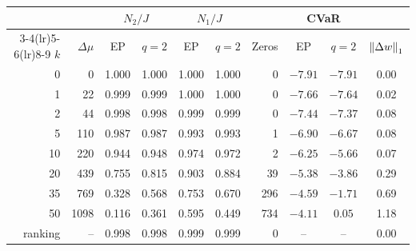 \begin{tabular}{rrccccrccc}
\toprule
 & & \multicolumn{2}{c}{$N_2/J$} & \multicolumn{2}{c}{$N_1/J$} & & \multicolumn{2}{c}{CVaR} & \\
\cmidrule(lr){3-4}\cmidrule(lr){5-6}\cmidrule(lr){8-9}
$k$ & $\Delta\mu$ & EP & $q=2$ & EP & $q=2$ & Zeros & EP & $q=2$ & $\left\lVert \Delta w \right\rVert_1$ \\
\midrule
0 & 0 & 1.000 & 1.000 & 1.000 & 1.000 & 0 & $-7.91$ & $-7.91$ & 0.00 \\
1 & 22 & 0.999 & 0.999 & 1.000 & 1.000 & 0 & $-7.66$ & $-7.64$ & 0.02 \\
2 & 44 & 0.998 & 0.998 & 0.999 & 0.999 & 0 & $-7.44$ & $-7.37$ & 0.08 \\
5 & 110 & 0.987 & 0.987 & 0.993 & 0.993 & 1 & $-6.90$ & $-6.67$ & 0.08 \\
10 & 220 & 0.944 & 0.948 & 0.974 & 0.972 & 2 & $-6.25$ & $-5.66$ & 0.07 \\
20 & 439 & 0.755 & 0.815 & 0.903 & 0.884 & 39 & $-5.38$ & $-3.86$ & 0.29 \\
35 & 769 & 0.328 & 0.568 & 0.753 & 0.670 & 296 & $-4.59$ & $-1.71$ & 0.69 \\
50 & 1098 & 0.116 & 0.361 & 0.595 & 0.449 & 734 & $-4.11$ & $0.05$ & 1.18 \\
\midrule
ranking & -- & 0.998 & 0.998 & 0.999 & 0.999 & 0 & -- & -- & 0.00 \\
\bottomrule
\end{tabular}
